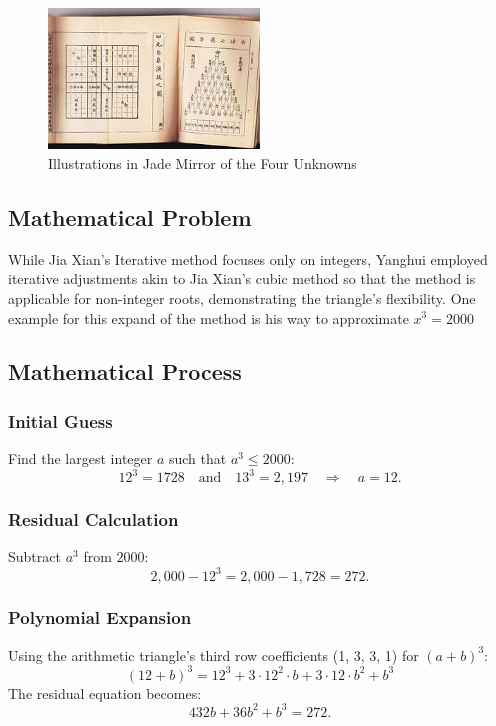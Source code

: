 \documentclass{article}
\begin{document}
\begin{figure}[h!tbp]
\centering
\includegraphics[width=0.5\textwidth]{Essay/Draft_2/Yanghui.jpg}
\caption{Illustrations in Jade Mirror of the Four Unknowns}
\label{fig:yang}
\end{figure}


\subsection{Mathematical Problem}

While Jia Xian's Iterative method focuses only on integers, Yanghui employed iterative adjustments akin to Jia Xian’s cubic method so that the method is applicable for non-integer roots, demonstrating the triangle’s flexibility. One example for this expand of the method is his way to approximate $x^3=2000$ \citep{needham1993}

\subsection{Mathematical Process}

\subsubsection{Initial Guess}
Find the largest integer \( a \) such that \( a^3 \leq 2000 \):
\[
12^3 = 1728 \quad \text{and} \quad 13^3 = 2,\!197 \quad \Rightarrow \quad a = 12.
\]

\subsubsection{Residual Calculation}
Subtract \( a^3 \) from \( 2000 \):
\[
2,\!000 - 12^3 = 2,\!000 - 1,\!728 = 272.
\]

\subsubsection{Polynomial Expansion}
Using the arithmetic triangle's third row coefficients (1, 3, 3, 1) for \( (a + b)^3 \):
\[
(12 + b)^3 = 12^3 + 3 \cdot 12^2 \cdot b + 3 \cdot 12 \cdot b^2 + b^3
\]
The residual equation becomes:
\[
432b + 36b^2 + b^3 = 272.
\]
\end{document}
